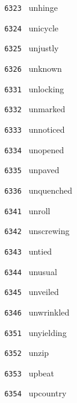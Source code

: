 \documentclass[11pt]{article}
\begin{document}
\begin{multicols}{6}
\noindent \texttt{ 6323 } \hspace{1mm} unhinge  \par
\noindent \texttt{ 6324 } \hspace{1mm} unicycle  \par
\noindent \texttt{ 6325 } \hspace{1mm} unjustly  \par
\noindent \texttt{ 6326 } \hspace{1mm} unknown  \par
\noindent \texttt{ 6331 } \hspace{1mm} unlocking  \par
\noindent \texttt{ 6332 } \hspace{1mm} unmarked  \par
\noindent \texttt{ 6333 } \hspace{1mm} unnoticed  \par
\noindent \texttt{ 6334 } \hspace{1mm} unopened  \par
\noindent \texttt{ 6335 } \hspace{1mm} unpaved  \par
\noindent \texttt{ 6336 } \hspace{1mm} unquenched  \par
\noindent \texttt{ 6341 } \hspace{1mm} unroll  \par
\noindent \texttt{ 6342 } \hspace{1mm} unscrewing  \par
\noindent \texttt{ 6343 } \hspace{1mm} untied  \par
\noindent \texttt{ 6344 } \hspace{1mm} unusual  \par
\noindent \texttt{ 6345 } \hspace{1mm} unveiled  \par
\noindent \texttt{ 6346 } \hspace{1mm} unwrinkled  \par
\noindent \texttt{ 6351 } \hspace{1mm} unyielding  \par
\noindent \texttt{ 6352 } \hspace{1mm} unzip  \par
\noindent \texttt{ 6353 } \hspace{1mm} upbeat  \par
\noindent \texttt{ 6354 } \hspace{1mm} upcountry  \par

\end{multicols}
\end{document}
